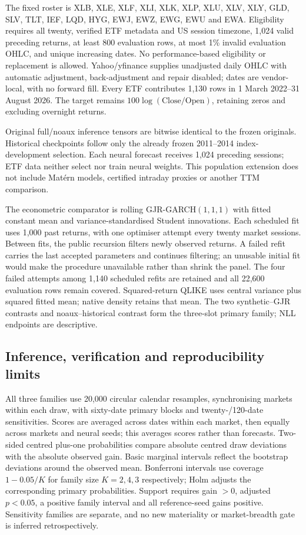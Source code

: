 The fixed roster is XLB, XLE, XLF, XLI, XLK, XLP, XLU, XLV, XLY, GLD, SLV, TLT, IEF, LQD, HYG, EWJ, EWZ, EWG, EWU and EWA. Eligibility requires all twenty, verified ETF metadata and US session timezone, 1,024 valid preceding returns, at least 800 evaluation rows, at most 1\% invalid evaluation OHLC, and unique increasing dates. No performance-based eligibility or replacement is allowed. Yahoo/yfinance supplies unadjusted daily OHLC with automatic adjustment, back-adjustment and repair disabled; dates are vendor-local, with no forward fill. Every ETF contributes 1,130 rows in 1 March 2022--31 August 2026. The target remains $100\log(\mathrm{Close}/\mathrm{Open})$, retaining zeros and excluding overnight returns.

Original full/noaux inference tensors are bitwise identical to the frozen originals. Historical checkpoints follow only the already frozen 2011--2014 index-development selection. Each neural forecast receives 1,024 preceding sessions; ETF data neither select nor train neural weights. This population extension does not include Mat\'ern models, certified intraday proxies or another TTM comparison.

The econometric comparator is rolling GJR-GARCH$(1,1,1)$ with fitted constant mean and variance-standardised Student innovations. Each scheduled fit uses 1,000 past returns, with one optimiser attempt every twenty market sessions. Between fits, the public recursion filters newly observed returns. A failed refit carries the last accepted parameters and continues filtering; an unusable initial fit would make the procedure unavailable rather than shrink the panel. The four failed attempts among 1,140 scheduled refits are retained and all 22,600 evaluation rows remain covered. Squared-return QLIKE uses central variance plus squared fitted mean; native density retains that mean. The two synthetic--GJR contrasts and noaux--historical contrast form the three-slot primary family; NLL endpoints are descriptive.

\subsection{Inference, verification and reproducibility limits}

All three families use 20,000 circular calendar resamples, synchronising markets within each draw, with sixty-date primary blocks and twenty-/120-date sensitivities. Scores are averaged across dates within each market, then equally across markets and neural seeds; this averages scores rather than forecasts. Two-sided centred plus-one probabilities compare absolute centred draw deviations with the absolute observed gain. Basic marginal intervals reflect the bootstrap deviations around the observed mean. Bonferroni intervals use coverage $1-0.05/K$ for family size $K=2,4,3$ respectively; Holm adjusts the corresponding primary probabilities. Support requires gain $>0$, adjusted $p<0.05$, a positive family interval and all reference-seed gains positive. Sensitivity families are separate, and no new materiality or market-breadth gate is inferred retrospectively.


